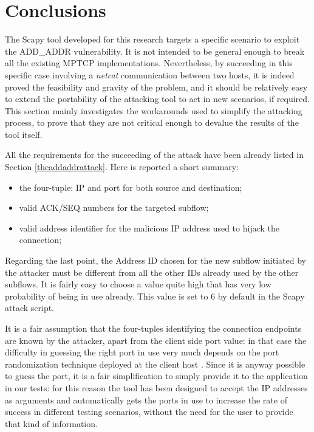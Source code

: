 \section{Conclusions} 
\label{limitationsandfuturework}
The Scapy tool developed for this research targets a specific scenario to exploit the ADD\_ADDR vulnerability. It is not intended to be general enough to break all the existing MPTCP implementations. Nevertheless, by succeeding in this specific case involving a \textit{netcat} communication between two hosts, it is indeed proved the feasibility and gravity of the problem, and it should be relatively easy to extend the portability of the attacking tool to act in new scenarios, if required.
This section mainly investigates the workarounds used to simplify the attacking process, to prove that they are not critical enough to devalue the results of the tool itself.

All the requirements for the succeeding of the attack have been already listed in Section \ref{theaddaddrattack}. Here is reported a short summary:

\begin{itemize}  
\item the four-tuple: IP and port for both source and destination;
\item valid ACK/SEQ numbers for the targeted subflow;
\item valid address identifier for the malicious IP address used to hijack the connection;
\end{itemize}

Regarding the last point, the Address ID chosen for the new subflow initiated by the attacker must be different from all the other IDs already used by the other subflows. It is fairly easy to choose a value quite high that has very low probability of being in use already. This value is set to 6 by default in the Scapy attack script.

It is a fair assumption that the four-tuples identifying the connection endpoints are known by the attacker, apart from the client side port value: in that case the difficulty in guessing the right port in use very much depends on the port randomization technique deployed at the client host . Since it is anyway possible to guess the port, it is a fair simplification to simply provide it to the application in our tests: for this reason the tool has been designed to accept the IP addresses as arguments and automatically gets the ports in use to increase the rate of success in different testing scenarios, without the need for the user to provide that kind of information.

